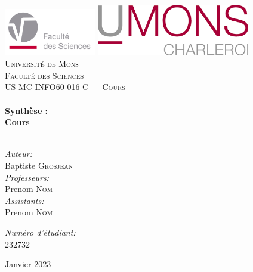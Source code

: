 

\begin{titlepage}

\begin{center}
\includegraphics[width=0.3\textwidth]{./Images/Logos/fs.pdf}\hfill
\includegraphics[width=0.5\textwidth]{./Images/Logos/umons_charleroi.png}\\[0.6cm]
\textsc{\LARGE Universit\'e de Mons}\\[0.4cm]
\textsc{\LARGE Facult\'e des Sciences}\\[1.5cm]
\textsc{\Large US-MC-INFO60-016-C — Cours }\\[0.5cm]
\HRule \\[0.4cm]
{ \huge \bfseries Synthèse :}\\[0.2cm]
{ \huge \bfseries Cours}\\[0.4cm]
\HRule \\[0.4cm]
\begin{minipage}{0.4\textwidth}
\begin{flushleft} \large
\emph{Auteur:}\\
Baptiste \textsc{Grosjean}\\
\emph{Professeurs:}\\
Prenom \textsc{Nom}\\
\emph{Assistants:}\\
Prenom \textsc{Nom}\\
\end{flushleft}
\end{minipage}
\begin{minipage}{0.4\textwidth}
\begin{flushright} \large
\emph{Num\'ero d'\'etudiant:} \\
232732
\end{flushright}
\end{minipage}
\begin{minipage}{1\textwidth}
\begin{center}
\renewcommand{\abstractname}{R\'esum\'e}
		\begin{abstract}
		Synthèse du cours de . 
		\end{abstract}
\end{center}
\end{minipage}
\vfill
{\large Janvier 2023}
\end{center}

\end{titlepage}
